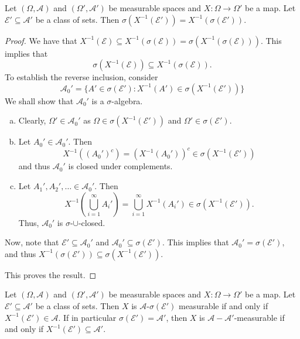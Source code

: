 \begin{theorem}
\label{generating pi system fixed under preimage}
    Let $(\Omega,\mathcal{A})$ and $(\Omega',\mathcal{A}')$ be measurable spaces and $X:\Omega\to\Omega'$ be a map.
    Let $\mathcal{E}'\subseteq\mathcal{A}'$ be a class of sets. Then $\sigma(X^{-1}(\mathcal{E}'))=X^{-1}(\sigma(\mathcal{E}'))$.
\end{theorem}
\begin{proof}
    We have that $X^{-1}(\mathcal{E})\subseteq X^{-1}(\sigma(\mathcal{E}))=\sigma(X^{-1}(\sigma(\mathcal{E})))$. This implies that
    $$\sigma(X^{-1}(\mathcal{E}))\subseteq X^{-1}(\sigma(\mathcal{E})).$$
    To establish the reverse inclusion, consider
    $$\mathcal{A}_0'=\{A'\in\sigma(\mathcal{E}'):X^{-1}(A')\in\sigma(X^{-1}(\mathcal{E}'))\}$$
    We shall show that $\mathcal{A}_0'$ is a $\sigma$-algebra.
    \begin{enumerate}[(a)]
        \item Clearly, $\Omega'\in\mathcal{A}_0'$ as $\Omega\in\sigma(X^{-1}(\mathcal{E}'))$ and $\Omega'\in\sigma(\mathcal{E}')$.
        
        \item Let $A_0'\in\mathcal{A}_0'$. Then
        $$X^{-1}((A_0')^c) = (X^{-1}(A_0'))^c \in \sigma(X^{-1}(\mathcal{E}'))$$
        and thus $\mathcal{A_0}'$ is closed under complements.
        
        \item Let $A_1',A_2',\ldots\in\mathcal{A}_0'$. Then
        $$X^{-1}\left(\bigcup_{i=1}^\infty A_i'\right) = \bigcup_{i=1}^\infty X^{-1}\left(A_i'\right)\in \sigma(X^{-1}(\mathcal{E}')).$$
        Thus, $\mathcal{A}_0'$ is $\sigma$-$\cup$-closed.
    \end{enumerate}
    
    Now, note that $\mathcal{E}'\subseteq\mathcal{A}_0'$ and $\mathcal{A}_0'\subseteq\sigma(\mathcal{E}')$. This implies that $\mathcal{A}_0'=\sigma(\mathcal{E}')$, and thus $X^{-1}(\sigma(\mathcal{E}'))\subseteq\sigma(X^{-1}(\mathcal{E}'))$.
    
    This proves the result.
\end{proof}

\begin{corollary}
\label{measurable if generator inv}
    Let $(\Omega,\mathcal{A})$ and $(\Omega',\mathcal{A}')$ be measurable spaces and $X:\Omega\to\Omega'$ be a map. Let $\mathcal{E}'\subseteq\mathcal{A}'$ be a class of sets. Then $X$ is $\mathcal{A}$-$\sigma(\mathcal{E}')$ measurable if and only if $X^{-1}(\mathcal{E}')\in\mathcal{A}$. If in particular $\sigma(\mathcal{E}')=\mathcal{A}'$, then $X$ is $\mathcal{A}-\mathcal{A}'$-measurable if and only if $X^{-1}(\mathcal{E}')\subseteq\mathcal{A}'$.
\end{corollary}

